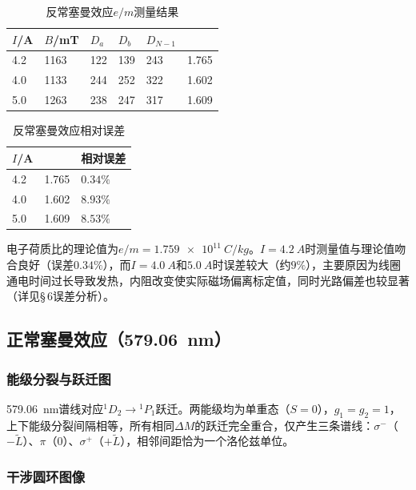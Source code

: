 \documentclass[a4paper,8pt,twocolumn]{article}
\begin{document}
\begin{table}[H]
\centering
\caption{反常塞曼效应$e/m$测量结果}
\label{tab:anomalous}
\begin{tabularx}{\columnwidth}{YYYYYY}
\toprule
$I$/A & $B$/mT & $D_a$ & $D_b$ & $D_{N\!-\!1}$ &  \\
 & 1163 & 122 & 139 & 243 & 1.765 \\
4.0 & 1133 & 244 & 252 & 322 & 1.602 \\
5.0 & 1263 & 238 & 247 & 317 & 1.609 \\
\bottomrule
\end{tabularx}
\end{table}

\begin{table}[H]
\centering
\caption{反常塞曼效应相对误差}
\label{tab:anomalous_err}
\begin{tabularx}{\columnwidth}{YYY}
\toprule
$I$/A &  & 相对误差 \\
 & 1.765 & $0.34\%$ \\
4.0 & 1.602 & $8.93\%$ \\
5.0 & 1.609 & $8.53\%$ \\
\bottomrule
\end{tabularx}
\end{table}

电子荷质比的理论值为$e/m = \SI{1.759e11}{C/kg}$。$I = \SI{4.2}{A}$时测量值与理论值吻合良好（误差$0.34\%$），而$I = \SI{4.0}{A}$和$\SI{5.0}{A}$时误差较大（约$9\%$），主要原因为线圈通电时间过长导致发热，内阻改变使实际磁场偏离标定值，同时光路偏差也较显著（详见§\,6误差分析）。

\subsection{正常塞曼效应（\SI{579.06}{nm}）}

\subsubsection{能级分裂与跃迁图}

\SI{579.06}{nm}谱线对应${}^1D_2 \to {}^1P_1$跃迁。两能级均为单重态（$S=0$），$g_1 = g_2 = 1$，上下能级分裂间隔相等，所有相同$\Delta M$的跃迁完全重合，仅产生三条谱线：$\sigma^-$（$-\tilde{L}$）、$\pi$（$0$）、$\sigma^+$（$+\tilde{L}$），相邻间距恰为一个洛伦兹单位。

\subsubsection{干涉圆环图像}
\end{document}
